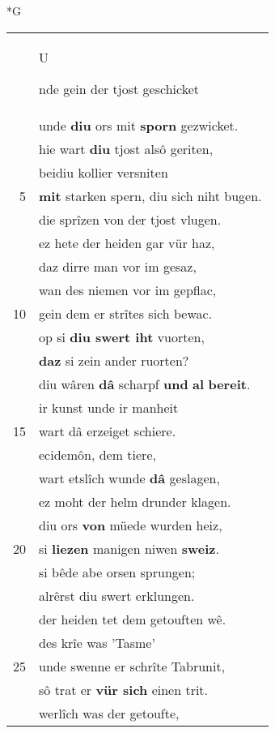 \documentclass[8pt,a4paper,notitlepage]{article}
\begin{document}
\newpage
\begin{table}[ht]
\begin{minipage}[t]{0.5\linewidth}
\small
\begin{center}*G
\end{center}
\begin{tabular}{rl}
 & \begin{large}U\end{large}nde gein der tjost geschicket\\ 
 & unde \textbf{diu} ors mit \textbf{sporn} gezwicket.\\ 
 & hie wart \textbf{diu} tjost alsô geriten,\\ 
 & beidiu kollier versniten\\ 
5 & \textbf{mit} starken spern, diu sich niht bugen.\\ 
 & die sprîzen von der tjost vlugen.\\ 
 & ez hete der heiden gar vür haz,\\ 
 & daz dirre man vor im gesaz,\\ 
 & wan des niemen vor im gepflac,\\ 
10 & gein dem er strîtes sich bewac.\\ 
 & op si \textbf{diu swert iht} vuorten,\\ 
 & \textbf{daz} si zein ander ruorten?\\ 
 & diu wâren \textbf{dâ} scharpf \textbf{und} \textbf{al} \textbf{bereit}.\\ 
 & ir kunst unde ir manheit\\ 
15 & wart dâ erzeiget schiere.\\ 
 & ecidemôn, dem tiere,\\ 
 & wart etslîch wunde \textbf{dâ} geslagen,\\ 
 & ez moht der helm drunder klagen.\\ 
 & diu ors \textbf{von} müede wurden heiz,\\ 
20 & si \textbf{liezen} manigen niwen \textbf{sweiz}.\\ 
 & si bêde abe orsen sprungen;\\ 
 & alrêrst diu swert erklungen.\\ 
 & der heiden tet dem getouften wê.\\ 
 & des krîe was 'Tasme'\\ 
25 & unde swenne er schrîte Tabrunit,\\ 
 & sô trat er \textbf{vür sich} einen trit.\\ 
 & werlîch was der getoufte,\\ 

\end{tabular}
\end{minipage}
\end{table}
\end{document}
